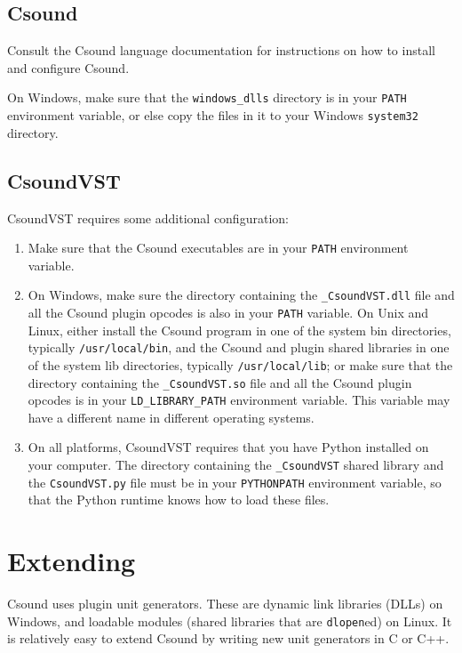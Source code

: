 \documentclass[10pt,letterpaper,onecolumn]{ltxguide}
\begin{document}
\subsection{Csound}

Consult the Csound language documentation for instructions on how to install and configure Csound.

On Windows, make sure that the \texttt{windows\_dlls} directory is in your \texttt{PATH} environment variable, or else copy the files in it to your Windows \texttt{system32} directory. 

\subsection{CsoundVST}
CsoundVST requires some additional configuration:
\begin{enumerate}
\item Make sure that the Csound executables are in your \texttt{PATH} environment variable. 
\item On Windows, make sure the directory containing the \texttt{\_CsoundVST.dll} file and all the Csound plugin opcodes is also in your \texttt{PATH} variable. On Unix and Linux, either install the Csound program in one of the system bin directories, typically \texttt{/usr/local/bin},  and the Csound and plugin shared libraries in one of the system lib directories, typically \texttt{/usr/local/lib}; or make sure that the directory containing the \texttt{\_CsoundVST.so} file and all the Csound plugin opcodes is in your \texttt{LD\_LIBRARY\_PATH} environment variable. This variable may have a different name in different operating systems.
\item On all platforms, CsoundVST requires that you have Python installed on your computer. The directory containing the \texttt{\_CsoundVST} shared library and the \texttt{CsoundVST.py} file must be in your \texttt{PYTHONPATH} environment variable, so that the Python runtime knows how to load these files.
\end{enumerate}

\section{Extending}
Csound uses plugin unit generators. These are dynamic link libraries (DLLs) on Windows, and loadable modules (shared libraries that are \texttt{dlopen}ed) on Linux. It is relatively easy to extend Csound by writing new unit generators in C or C++.
\end{document}
